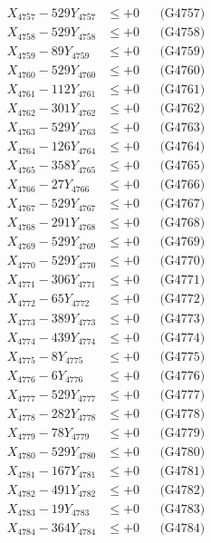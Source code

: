 \documentclass[a4paper,10pt]{article}
\begin{document}
{\begin{align}
X_{4757} - 529Y_{4757} &\leq +0 && \text{(G4757)} \\
X_{4758} - 529Y_{4758} &\leq +0 && \text{(G4758)} \\
X_{4759} - 89Y_{4759} &\leq +0 && \text{(G4759)} \\
X_{4760} - 529Y_{4760} &\leq +0 && \text{(G4760)} \\
\allowbreak
X_{4761} - 112Y_{4761} &\leq +0 && \text{(G4761)} \\
X_{4762} - 301Y_{4762} &\leq +0 && \text{(G4762)} \\
X_{4763} - 529Y_{4763} &\leq +0 && \text{(G4763)} \\
X_{4764} - 126Y_{4764} &\leq +0 && \text{(G4764)} \\
X_{4765} - 358Y_{4765} &\leq +0 && \text{(G4765)} \\
X_{4766} - 27Y_{4766} &\leq +0 && \text{(G4766)} \\
X_{4767} - 529Y_{4767} &\leq +0 && \text{(G4767)} \\
X_{4768} - 291Y_{4768} &\leq +0 && \text{(G4768)} \\
X_{4769} - 529Y_{4769} &\leq +0 && \text{(G4769)} \\
X_{4770} - 529Y_{4770} &\leq +0 && \text{(G4770)} \\
\allowbreak
X_{4771} - 306Y_{4771} &\leq +0 && \text{(G4771)} \\
X_{4772} - 65Y_{4772} &\leq +0 && \text{(G4772)} \\
X_{4773} - 389Y_{4773} &\leq +0 && \text{(G4773)} \\
X_{4774} - 439Y_{4774} &\leq +0 && \text{(G4774)} \\
X_{4775} - 8Y_{4775} &\leq +0 && \text{(G4775)} \\
X_{4776} - 6Y_{4776} &\leq +0 && \text{(G4776)} \\
X_{4777} - 529Y_{4777} &\leq +0 && \text{(G4777)} \\
X_{4778} - 282Y_{4778} &\leq +0 && \text{(G4778)} \\
X_{4779} - 78Y_{4779} &\leq +0 && \text{(G4779)} \\
X_{4780} - 529Y_{4780} &\leq +0 && \text{(G4780)} \\
\allowbreak
X_{4781} - 167Y_{4781} &\leq +0 && \text{(G4781)} \\
X_{4782} - 491Y_{4782} &\leq +0 && \text{(G4782)} \\
X_{4783} - 19Y_{4783} &\leq +0 && \text{(G4783)} \\
X_{4784} - 364Y_{4784} &\leq +0 && \text{(G4784)} \\

\end{align}}
\end{document}
